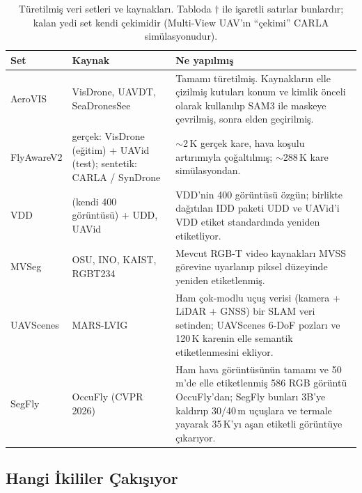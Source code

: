 \begin{table}[H]
  \centering
  \caption{Türetilmiş veri setleri ve kaynakları. Tabloda $\dagger$ ile
    işaretli satırlar bunlardır; kalan yedi set kendi çekimidir
    (Multi-View UAV'ın ``çekimi'' CARLA simülasyonudur).}
  \label{tab:veri-seti-kaynaklari}
  \footnotesize
  \setlength{\tabcolsep}{4pt}
  \renewcommand{\arraystretch}{1.18}
  \begin{tabular}{@{}
      >{\raggedright\arraybackslash}p{24mm}
      >{\raggedright\arraybackslash}p{40mm}
      >{\raggedright\arraybackslash}p{68mm}@{}}
    \toprule
    \textbf{Set} & \textbf{Kaynak} & \textbf{Ne yapılmış} \\
    \midrule
    AeroVIS & VisDrone, UAVDT, SeaDronesSee &
      Tamamı türetilmiş. Kaynakların elle çizilmiş kutuları konum ve
      kimlik önceli olarak kullanılıp SAM3 ile maskeye çevrilmiş,
      sonra elden geçirilmiş. \\
    FlyAwareV2 & gerçek: VisDrone (eğitim) + UAVid (test);
      sentetik: CARLA / SynDrone &
      $\sim$2\,K gerçek kare, hava koşulu artırımıyla çoğaltılmış;
      $\sim$288\,K kare simülasyondan. \\
    VDD & (kendi 400 görüntüsü) + UDD, UAVid &
      VDD'nin 400 görüntüsü özgün; birlikte dağıtılan IDD paketi UDD ve
      UAVid'i VDD etiket standardında yeniden etiketliyor. \\
    MVSeg & OSU, INO, KAIST, RGBT234 &
      Mevcut RGB-T video kaynakları MVSS görevine uyarlanıp piksel
      düzeyinde yeniden etiketlenmiş. \\
    UAVScenes & MARS-LVIG &
      Ham çok-modlu uçuş verisi (kamera + LiDAR + GNSS) bir SLAM veri
      setinden; UAVScenes 6-DoF pozları ve 120\,K karenin elle
      semantik etiketlenmesini ekliyor. \\
    SegFly & OccuFly (CVPR 2026) &
      Ham hava görüntüsünün tamamı ve 50\,m'de elle etiketlenmiş 586
      RGB görüntü OccuFly'dan; SegFly bunları 3B'ye kaldırıp 30/40\,m
      uçuşlara ve termale yayarak 35\,K'yı aşan etiketli görüntüye
      çıkarıyor. \\
    \bottomrule
  \end{tabular}
\end{table}

\subsection*{Hangi İkililer Çakışıyor}

